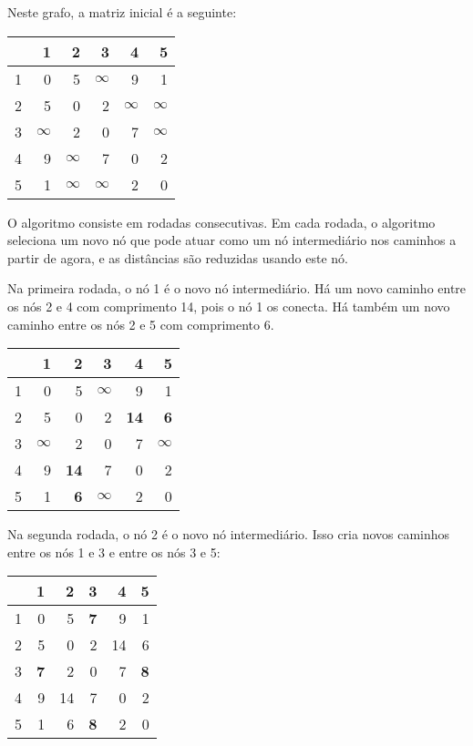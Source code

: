 Neste grafo, a matriz inicial é a seguinte:
\begin{center}
\begin{tabular}{r|rrrrr}
 & 1 & 2 & 3 & 4 & 5 \\
\hline
1 & 0 & 5 & $\infty$ & 9 & 1 \\
2 & 5 & 0 & 2 & $\infty$ & $\infty$ \\
3 & $\infty$ & 2 & 0 & 7 & $\infty$ \\
4 & 9 & $\infty$ & 7 & 0 & 2 \\
5 & 1 & $\infty$ & $\infty$ & 2 & 0 \\
\end{tabular}
\end{center}
\vspace{10pt}
O algoritmo consiste em rodadas consecutivas.
Em cada rodada, o algoritmo seleciona um novo nó
que pode atuar como um nó intermediário nos caminhos a partir de agora,
e as distâncias são reduzidas usando este nó.

Na primeira rodada, o nó 1 é o novo nó intermediário.
Há um novo caminho entre os nós 2 e 4
com comprimento 14, pois o nó 1 os conecta.
Há também um novo caminho
entre os nós 2 e 5 com comprimento 6.

\begin{center}
\begin{tabular}{r|rrrrr}
 & 1 & 2 & 3 & 4 & 5 \\
\hline
1 & 0 & 5 & $\infty$ & 9 & 1 \\
2 & 5 & 0 & 2 & \textbf{14} & \textbf{6} \\
3 & $\infty$ & 2 & 0 & 7 & $\infty$ \\
4 & 9 & \textbf{14} & 7 & 0 & 2 \\
5 & 1 & \textbf{6} & $\infty$ & 2 & 0 \\
\end{tabular}
\end{center}
\vspace{10pt}

Na segunda rodada, o nó 2 é o novo nó intermediário.
Isso cria novos caminhos entre os nós 1 e 3
e entre os nós 3 e 5:

\begin{center}
\begin{tabular}{r|rrrrr}
 & 1 & 2 & 3 & 4 & 5 \\
\hline
1 & 0 & 5 & \textbf{7} & 9 & 1 \\
2 & 5 & 0 & 2 & 14 & 6 \\
3 & \textbf{7} & 2 & 0 & 7 & \textbf{8} \\
4 & 9 & 14 & 7 & 0 & 2 \\
5 & 1 & 6 & \textbf{8} & 2 & 0 \\
\end{tabular}
\end{center}
\vspace{10pt}

